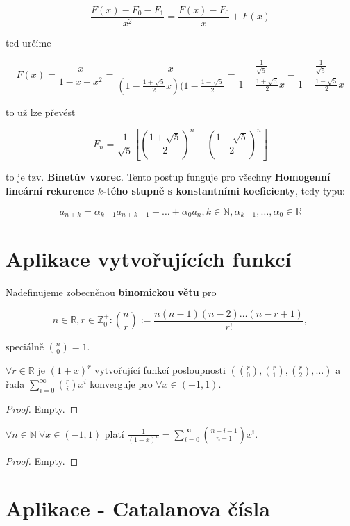 $$
\frac{F(x)-F_0 - F_1}{x^2} = \frac{F(x)-F_0}{x} +F(x)
$$

teď určíme

$$
F(x) = \frac{x}{1-x-x^2} = \frac{x}{(1 - \frac{1 + \sqrt{5}}{2}x)(1 - \frac{1 - \sqrt{5}}{2}} = \frac{\frac{1}{\sqrt{5}}}{1 - \frac{1 + \sqrt{5}}{2}x} - \frac{\frac{1}{\sqrt{5}}}{1 - \frac{1 - \sqrt{5}}{2}x}
$$

to už lze převést

$$
F_n = \frac{1}{\sqrt{5}}\left[ \left( \frac{1+\sqrt{5}}{2} \right)^n - \left( \frac{1-\sqrt{5}}{2} \right)^n \right]
$$

to je tzv. \textbf{Binetův vzorec}. Tento postup funguje pro všechny \textbf{Homogenní lineární rekurence $k$-tého stupně s konstantními koeficienty}, tedy typu:

$$
a_{n+k} = \alpha_{k-1}a_{n+k-1} + \dots + \alpha_0 a_n, k \in \mathbb{N}, \alpha_{k-1}, \dots, \alpha_0 \in \mathbb{R}
$$

\section{Aplikace vytvořujících funkcí}

Nadefinujeme zobecněnou \textbf{binomickou větu} pro

$$
n \in \mathbb{R}, r \in \mathbb{Z}_{0}^{+}: \binom{n}{r}:= \frac{n(n-1)(n-2)\dots(n-r+1)}{r!},
$$

speciálně $\binom{n}{0}=1$.

\begin{veta}
	$\forall r \in \mathbb{R}$ je $(1+x)^r$ vytvořující funkcí posloupnosti $\left( \binom{r}{0}, \binom{r}{1}, \binom{r}{2}, \dots \right)$ a řada $\sum_{i=0}^{\infty}\binom{r}{i}x^{i}$ konverguje pro $\forall x \in (-1, 1)$.	
\end{veta}

\begin{proof}
	Empty.
\end{proof}

\begin{dusl}
	$\forall n \in \mathbb{N} \ \forall x \in (-1,1)$ platí $\frac{1}{(1-x)^{n}}=\sum_{i=0}^{\infty}\binom{n+i-1}{n-1} x^{i}$.
\end{dusl}

\begin{proof}
	Empty.
\end{proof}

\section{Aplikace - Catalanova čísla}

